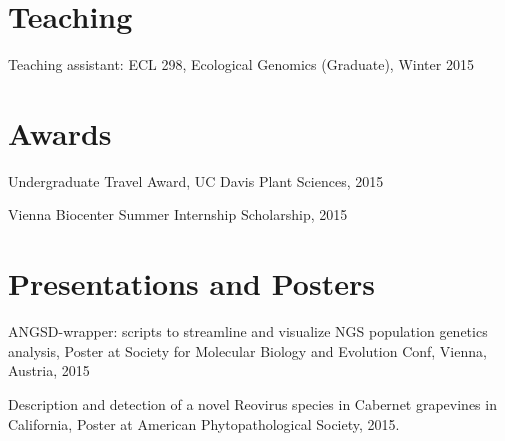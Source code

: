 \documentclass[letterpaper]{article}
\renewenvironment{itemize}{
  \begin{list}{}{
    \setlength{\leftmargin}{1em}
  }
}{
  \end{list}
}
\begin{document}
\setlength\parskip{0em}

\section*{Teaching}
\begin{itemize}
\item Teaching assistant: ECL 298, Ecological Genomics (Graduate), Winter 2015
\end{itemize}

\section*{Awards}
\begin{itemize}
\item Undergraduate Travel Award, UC Davis Plant Sciences, 2015
\item Vienna Biocenter Summer Internship Scholarship, 2015
\end{itemize}

\setlength\parskip{0.15em}
\section*{Presentations and Posters}
\begin{itemize}
\item ANGSD-wrapper: scripts to streamline and visualize NGS population genetics analysis, Poster at Society for Molecular Biology and Evolution Conf, Vienna, Austria, 2015
\item Description and detection of a novel Reovirus species in Cabernet grapevines in California, Poster at American Phytopathological Society, 2015.
\end{itemize}

\setlength\parskip{0.5em}
\end{document}
